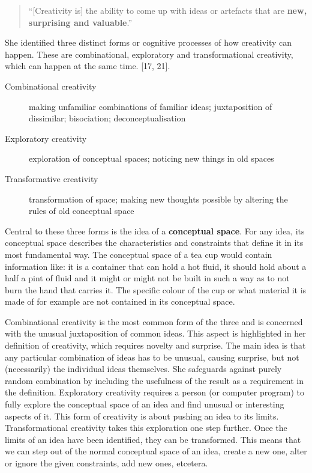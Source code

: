 \begin{quotation}
  ``[Creativity is] the ability to come up with ideas or artefacts that are \textbf{new, surprising and valuable}.'' 
\end{quotation}

She identified three distinct forms or cognitive processes of how creativity can happen. These are combinational, exploratory and transformational creativity, which can happen at the same time. \autocite{Boden2003}[17, 21].

\begin{description}
  \item [Combinational creativity] making unfamiliar combinations of familiar ideas; juxtaposition of dissimilar; bisociation; deconceptualisation
  \item [Exploratory creativity] exploration of conceptual spaces; noticing new things in old spaces
  \item [Transformative creativity] transformation of space; making new thoughts possible by altering the rules of old conceptual space
\end{description}

Central to these three forms is the idea of a \textbf{conceptual space}. For any idea, its conceptual space describes the characteristics and constraints that define it in its most fundamental way. The conceptual space of a tea cup would contain information like: it is a container that can hold a hot fluid, it should hold about a half a pint of fluid and it might or might not be built in such a way as to not burn the hand that carries it. The specific colour of the cup or what material it is made of for example are not contained in its conceptual space.

Combinational creativity is the most common form of the three and is concerned with the unusual juxtaposition of common ideas. This aspect is highlighted in her definition of creativity, which requires novelty and surprise. The main idea is that any particular combination of ideas has to be unusual, causing surprise, but not (necessarily) the individual ideas themselves. She safeguards against purely random combination by including the usefulness of the result as a requirement in the definition. Exploratory creativity requires a person (or computer program) to fully explore the conceptual space of an idea and find unusual or interesting aspects of it. This form of creativity is about pushing an idea to its limits. Transformational creativity takes this exploration one step further. Once the limits of an idea have been identified, they can be transformed. This means that we can step out of the normal conceptual space of an idea, create a new one, alter or ignore the given constraints, add new ones, etcetera.

